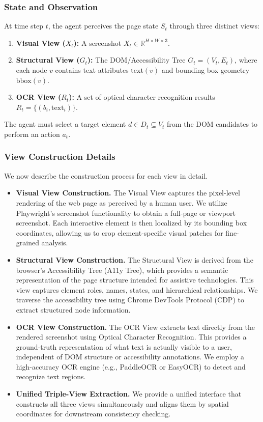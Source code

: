 \documentclass{llncs}
\begin{document}
\subsubsection{State and Observation}
At time step $t$, the agent perceives the page state $S_t$ through three distinct views:
\begin{enumerate}
    \item \textbf{Visual View ($X_t$):} A screenshot $X_t \in \mathbb{R}^{H\times W\times 3}$.
    \item \textbf{Structural View ($G_t$):} The DOM/Accessibility Tree $G_t=(V_t, E_t)$, where each node $v$ contains text attributes $\text{text}(v)$ and bounding box geometry $\text{bbox}(v)$.
    \item \textbf{OCR View ($R_t$):} A set of optical character recognition results $R_t=\{(b_i, \text{text}_i)\}$.
\end{enumerate}
The agent must select a target element $d \in D_t \subseteq V_t$ from the DOM candidates to perform an action $a_t$.

\subsubsection{View Construction Details}
We now describe the construction process for each view in detail.
\begin{itemize}
    \item \textbf{Visual View Construction.} The Visual View captures the pixel-level rendering of the web page as perceived by a human user. We utilize Playwright's screenshot functionality to obtain a full-page or viewport screenshot. Each interactive element is then localized by its bounding box coordinates, allowing us to crop element-specific visual patches for fine-grained analysis.
    \item \textbf{Structural View Construction.} The Structural View is derived from the browser's Accessibility Tree (A11y Tree), which provides a semantic representation of the page structure intended for assistive technologies. This view captures element roles, names, states, and hierarchical relationships. We traverse the accessibility tree using Chrome DevTools Protocol (CDP) to extract structured node information.
    \item \textbf{OCR View Construction.} The OCR View extracts text directly from the rendered screenshot using Optical Character Recognition. This provides a ground-truth representation of what text is actually visible to a user, independent of DOM structure or accessibility annotations. We employ a high-accuracy OCR engine (e.g., PaddleOCR or EasyOCR) to detect and recognize text regions.
    \item \textbf{Unified Triple-View Extraction.} We provide a unified interface that constructs all three views simultaneously and aligns them by spatial coordinates for downstream consistency checking.
\end{itemize}
\end{document}
